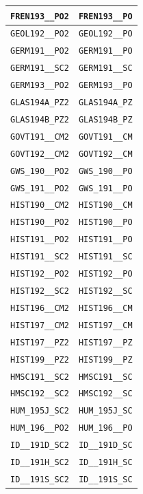 \begin{longtable}{|p{4.4in}|p{4.4in}|}
    \verb|FREN193__PO2| & \verb|FREN193__PO|\\\hline
    \verb|GEOL192__PO2| & \verb|GEOL192__PO|\\\hline
    \verb|GERM191__PO2| & \verb|GERM191__PO|\\\hline
    \verb|GERM191__SC2| & \verb|GERM191__SC|\\\hline
    \verb|GERM193__PO2| & \verb|GERM193__PO|\\\hline
    \verb|GLAS194A_PZ2| & \verb|GLAS194A_PZ|\\\hline
    \verb|GLAS194B_PZ2| & \verb|GLAS194B_PZ|\\\hline
    \verb|GOVT191__CM2| & \verb|GOVT191__CM|\\\hline
    \verb|GOVT192__CM2| & \verb|GOVT192__CM|\\\hline
    \verb|GWS_190__PO2| & \verb|GWS_190__PO|\\\hline
    \verb|GWS_191__PO2| & \verb|GWS_191__PO|\\\hline
    \verb|HIST190__CM2| & \verb|HIST190__CM|\\\hline
    \verb|HIST190__PO2| & \verb|HIST190__PO|\\\hline
    \verb|HIST191__PO2| & \verb|HIST191__PO|\\\hline
    \verb|HIST191__SC2| & \verb|HIST191__SC|\\\hline
    \verb|HIST192__PO2| & \verb|HIST192__PO|\\\hline
    \verb|HIST192__SC2| & \verb|HIST192__SC|\\\hline
    \verb|HIST196__CM2| & \verb|HIST196__CM|\\\hline
    \verb|HIST197__CM2| & \verb|HIST197__CM|\\\hline
    \verb|HIST197__PZ2| & \verb|HIST197__PZ|\\\hline
    \verb|HIST199__PZ2| & \verb|HIST199__PZ|\\\hline
    \verb|HMSC191__SC2| & \verb|HMSC191__SC|\\\hline
    \verb|HMSC192__SC2| & \verb|HMSC192__SC|\\\hline
    \verb|HUM_195J_SC2| & \verb|HUM_195J_SC|\\\hline
    \verb|HUM_196__PO2| & \verb|HUM_196__PO|\\\hline
    \verb|ID__191D_SC2| & \verb|ID__191D_SC|\\\hline
    \verb|ID__191H_SC2| & \verb|ID__191H_SC|\\\hline
    \verb|ID__191S_SC2| & \verb|ID__191S_SC|\\\hline

\end{longtable}
